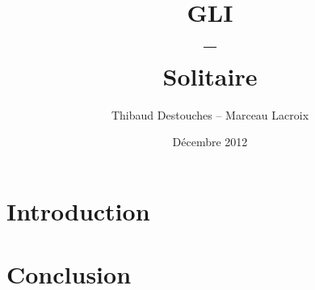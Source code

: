 \documentclass{article}
\title{GLI \\
-- \\
Solitaire}
\author{Thibaud Destouches -- Marceau Lacroix}
\date{Décembre 2012}
\begin{document}
\begin{titlepage}
\pagestyle{fancy}

  	\maketitle
  	\tableofcontents
\end{titlepage}

\newpage
\section{Introduction}


\newpage
\section{}


\section{Conclusion}
\end{document}
